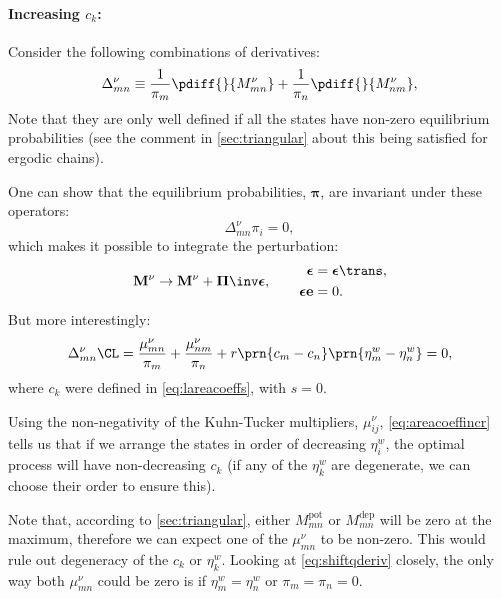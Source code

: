 \documentclass[12pt]{article}
\newcommand{\onev}{\mathbf{e}}
\newcommand{\eqm}{\pi}
\newcommand{\eq}{\boldsymbol{\eqm}}
\newcommand{\Eqm}{\Pi}
\newcommand{\Eq}{\boldsymbol{\Eqm}}
\newcommand{\etwm}{\eta^w}
\newcommand{\MMdm}{M}
\newcommand{\MMd}{\mathbf{\MMdm}}
\newcommand{\kktm}{\mu}
\newcommand{\pot}{^{\text{pot}}}
\newcommand{\dep}{^{\text{dep}}}
\begin{document}
\paragraph{Increasing \texorpdfstring{$c_k$}{c(k)}:}\label{sec:areacoeffincr}

Consider the following combinations of derivatives:
%
\begin{equation}\label{eq:areacoeffincrderiv}
    \Delta^\nu_{mn} \equiv
      \frac{1}{\eqm_m} \pdiff{}{\MMdm^\nu_{mn}}
      + \frac{1}{\eqm_n} \pdiff{}{\MMdm^\nu_{nm}}, 
\end{equation}
%
Note that they are only well defined if all the states have non-zero equilibrium probabilities (see the comment in \cref{sec:triangular} about this being satisfied for ergodic chains).

One can show that the equilibrium probabilities, $\eq$, are invariant under these operators:
%
\begin{equation}\label{eq:sareacoeffincrprob}
  \Delta^\nu_{mn} \eqm_i = 0,
\end{equation}
%
which makes it possible to integrate the perturbation:
%
\begin{equation}\label{eq:areacoeffincrfinite}
  \MMd^\nu \to \MMd^\nu + \Eq\inv \boldsymbol{\epsilon},
  \qquad
  \begin{aligned}
  \boldsymbol{\epsilon} &= \boldsymbol{\epsilon}\trans,
  \\
  \boldsymbol{\epsilon} \onev &= 0.
  \end{aligned}
\end{equation}
%
But more interestingly:
%
\begin{equation}\label{eq:areacoeffincr}
    \Delta^\nu_{mn}\CL =
      \frac{\kktm^\nu_{mn}}{\eqm_m} + \frac{\kktm^\nu_{nm}}{\eqm_n}
      + r \prn{c_m - c_n}\prn{\etwm_m - \etwm_n} = 0,
\end{equation}
%
where $c_k$ were defined in \cref{eq:lareacoeffs}, with \(s = 0\).

Using the non-negativity of the Kuhn-Tucker multipliers, $\kktm^\nu_{ij}$, \cref{eq:areacoeffincr} tells us that if we arrange the states in order of decreasing $\etwm_i$, the optimal process will have non-decreasing $c_k$ (if any of the $\etwm_k$ are degenerate, we can choose their order to ensure this).

Note that, according to \cref{sec:triangular}, either $\MMdm\pot_{mn}$ or $\MMdm\dep_{mn}$ will be zero at the maximum, 
therefore we can expect one of the $\kktm^\nu_{mn}$ to be non-zero.
This would rule out degeneracy of the $c_k$ or $\etwm_k$.
Looking at \cref{eq:shiftqderiv} closely, the only way both $\kktm^\nu_{mn}$ could be zero is if $\etwm_m = \etwm_n$ or $\eqm_m = \eqm_n = 0$.
\end{document}
